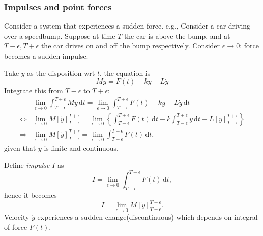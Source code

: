 \documentclass[a4paper]{article}
\begin{document}
      \subsubsection{Impulses and point forces}
      Consider a system that experiences a sudden force. e.g., Consider a car driving over a speedbump. Suppose at time $T$ the car is above the bump, and at $T-\epsilon, T+\epsilon$ the car drives on and off the bump respectively. Consider $ \epsilon\to 0 $: force becomes a sudden impulse.
      \begin{center}
      \end{center}
      Take $y$ as the disposition wrt $t$, the equation is 
      \begin{equation}
          M \ddot{y} = F(t)-ky-L \dot{y}
      \end{equation}
      Integrate this from $T-\epsilon$ to $T+\epsilon$:
      \[
          \begin{aligned}
            &\lim_{\epsilon \to 0} \int_{T-\epsilon}^{T+\epsilon} M \ddot{y} \,\mathrm{d}t = \lim_{\epsilon \to 0} \int_{T-\epsilon}^{T+\epsilon} F(t)-ky-L \dot{y} \,\mathrm{d}t\\
            \Longleftrightarrow & \lim_{\epsilon \to 0} M\left[ \dot{y} \right]_{T-\epsilon}^{T+\epsilon} = \lim_{\epsilon \to 0} \left\{ \int_{T-\epsilon}^{T+\epsilon} F(t) \,\mathrm{d}t - k \int_{T-\epsilon}^{T+\epsilon} y \,\mathrm{d}t - L\left[ y \right]_{T-\epsilon}^{T+\epsilon}\right\}\\
            \Longrightarrow & \lim_{\epsilon \to 0} M\left[ \dot{y} \right]_{T-\epsilon}^{T+\epsilon} = \lim_{\epsilon \to 0} \int_{T-\epsilon}^{T+\epsilon} F(t) \,\mathrm{d}t,
          \end{aligned}
      \]
      given that $y$ is finite and continuous.

      Define \textit{impulse} $I$ as 
      \[
          I =\lim_{\epsilon \to 0} \int_{T-\epsilon}^{T+\epsilon} F(t) \,\mathrm{d}t
      ,\]
      hence it becomes 
      \[
          I = \lim_{\epsilon \to 0} M\left[ \dot{y} \right]_{T-\epsilon}^{T+\epsilon}
      .\]
      Velocity $ \dot{y} $ experiences a sudden change(discontinuous) which depends on integral of force $ F(t) $.
\end{document}
